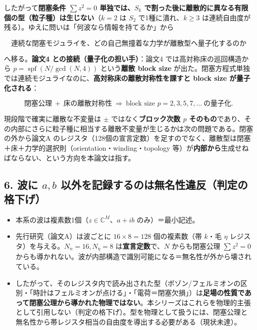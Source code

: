 \documentclass[
  a4paper,
]{ltjsarticle}
\providecommand{\tightlist}{%
  \setlength{\itemsep}{0pt}\setlength{\parskip}{0pt}}
\begin{document}
したがって\textbf{閉塞条件 \(\sum z^2=0\) 単独では、\(S_k\)
で割った後に離散的に異なる有限個の型（粒子種）は生じない}（\(k=2\) は
\(S_2\) で1種に潰れ、\(k\ge3\)
は連続自由度が残る）。ゆえに問いは「何波なら情報を持てるか」から

\[\boxed{\text{連続な閉塞モジュライを、どの自己無撞着な力学が離散型へ量子化するのか}}\]

へ移る。\textbf{論文4 との接続（量子化の担い手）}：論文4
では高対称床の巡回構造から \(p=\operatorname{spf}(N/\gcd(N,4))\)
という\textbf{離散 block size}
が出た。閉塞方程式単独では連続モジュライなのに、\textbf{高対称床の離散対称性を課すと
block size が量子化される}：

\[\text{閉塞公理}\ +\ \text{床の離散対称性}\ \Longrightarrow\ \text{block size }p=2,3,5,7,\ldots\ \text{の量子化}.\]

現段階で確実に離散な不変量は \(\pm\) ではなく\textbf{ブロック次数 \(p\)
そのもの}であり、その内部にさらに粒子種に相当する離散不変量が生じるかは次の問題である。閉塞の外から論文A
のレジスタ（128個の宣言定数）を足すのでなく、離散型は閉塞＋床＋力学的選択則（orientation・winding・topology
等）が\textbf{内部から}生成せねばならない、という方向を本論文は指す。

\subsection{\texorpdfstring{6. 波に \(a,b\)
以外を記録するのは無名性違反（判定の格下げ）}{6. 波に a,b 以外を記録するのは無名性違反（判定の格下げ）}}\label{ux6ce2ux306b-ab-ux4ee5ux5916ux3092ux8a18ux9332ux3059ux308bux306eux306fux7121ux540dux6027ux9055ux53cdux5224ux5b9aux306eux683cux4e0bux3052}

\begin{itemize}
\tightlist
\item
  本系の波は複素数1個（\(z\in\mathbb C^M\)、\(a+ib\) のみ）＝最小記述。
\item
  先行研究（論文A）は波ごとに \(16\times8=128\) 個の複素数（帯 \(k\)・毛
  \(\eta\) レジスタ）を与える。\(N_n=16,N_\eta=8\)
  は\textbf{宣言定数}で、\(N\) からも閉塞公理 \(\sum z^2=0\)
  からも導かれない。波が内部構造で識別可能になる＝無名性が外から壊されている。
\item
  したがって、そのレジスタ内で読み出された型（ボゾン/フェルミオンの区別・「時計はフェルミオンが点ける」・「電荷＝閉塞欠損」）は\textbf{足場の性質であって閉塞公理から導かれた物理ではない}。本シリーズはこれらを物理的主張として引用しない（判定の格下げ）。型を物理として扱うには、閉塞公理と無名性から帯レジスタ相当の自由度を導出する必要がある（現状未達）。
\end{itemize}
\end{document}
